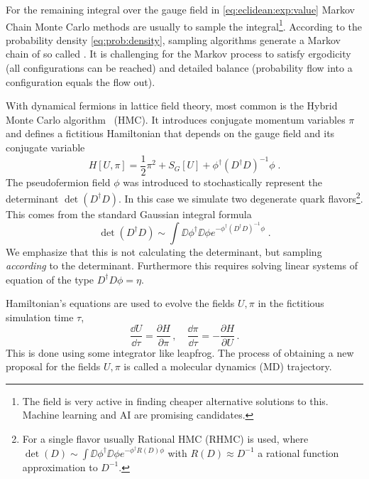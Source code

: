 
For the remaining integral over the gauge field in \cref{eq:eclidean:exp:value} Markov Chain Monte Carlo methods are usually to sample the integral\footnote{The field is very active in finding cheaper alternative solutions to this. Machine learning and AI are promising candidates.}.
According to the probability density \cref{eq:prob:density}, sampling algorithms generate a Markov chain of so called .
It is challenging for the Markov process to satisfy ergodicity~\cite{10.1063/5.0004106,PhysRevLett.60.1243} (all configurations can be reached) and detailed balance (probability flow into a configuration equals the flow out).

With dynamical fermions in lattice field theory, most common is the Hybrid Monte Carlo algorithm~\cite{DUANE1987216} (HMC).
It introduces conjugate momentum variables $\pi$ and defines a fictitious Hamiltonian that depends on the gauge field and its conjugate variable
\begin{equation}
H[U, \pi] = \frac{1}{2} \pi^{2} + S_{G}[U] + \phi^{\dagger} (D^{\dagger} D)^{-1} \phi \;.
\end{equation}
The pseudofermion field $\phi$ was introduced to stochastically represent the determinant $\det(D^{\dagger} D)$.
In this case we simulate two degenerate quark flavors\footnote{For a single flavor usually Rational HMC (RHMC) is used, where $\det(D) \sim \int \DD \phi^{\dagger} \DD \phi e^{-\phi^{\dagger} R(D) \phi}$ with $R(D) \approx D^{-1}$ a rational function approximation to $D^{-1}$.}.
This comes from the standard Gaussian integral formula
\begin{equation}
\det(D^{\dagger} D) \sim \int \DD \phi^{\dagger} \DD \phi e^{- \phi^{\dagger} ( D^{\dagger} D )^{-1} \phi} \;.
\end{equation}
We emphasize that this is not calculating the determinant, but sampling \emph{according} to the determinant.
Furthermore this requires solving linear systems of equation of the type $D^{\dagger} D \phi = \eta$.

Hamiltonian's equations are used to evolve the fields $U, \pi$ in the fictitious simulation time $\tau$,
\begin{equation}
\frac{\dd U}{\dd \tau} = \frac{\partial H}{\partial \pi} \,,
\quad
\frac{\dd \pi}{\dd \tau} = -\frac{\partial H}{\partial U} \,.
\end{equation}
This is done using some integrator like leapfrog.
The process of obtaining a new proposal for the fields $U, \pi$ is called a molecular dynamics (MD) trajectory.

